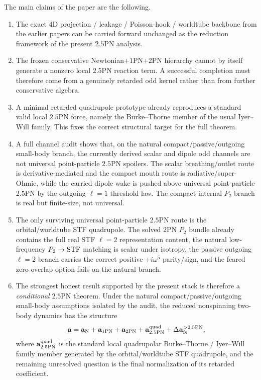 \documentclass[11pt]{article}
\begin{document}
The main claims of the paper are the following.
\begin{enumerate}
  \item The exact $4$D projection / leakage / Poisson-hook / worldtube backbone
  from the earlier papers can be carried forward unchanged as the reduction
  framework of the present $2.5$PN analysis.

  \item The frozen conservative Newtonian+$1$PN+$2$PN hierarchy cannot by itself
  generate a nonzero local $2.5$PN reaction term.  A successful completion must
  therefore come from a genuinely retarded odd kernel rather than from further
  conservative algebra.

  \item A minimal retarded quadrupole prototype already reproduces a standard
  valid local $2.5$PN force, namely the Burke--Thorne member of the usual
  Iyer--Will family.  This fixes the correct structural target for the full
  theorem.

  \item A full channel audit shows that, on the natural compact/passive/outgoing
  small-body branch, the currently derived scalar and dipole odd channels are not
  universal point-particle $2.5$PN spoilers.  The scalar breathing/outlet route
  is derivative-mediated and the compact mouth route is radiative/super-Ohmic,
  while the carried dipole wake is pushed above universal point-particle $2.5$PN
  by the outgoing $\ell=1$ threshold law.  The compact internal $P_2$ branch is
  real but finite-size, not universal.

  \item The only surviving universal point-particle $2.5$PN route is the
  orbital/worldtube STF quadrupole.  The solved $2$PN $P_2$ bundle already
  contains the full real STF $\ell=2$ representation content, the natural
  low-frequency $P_2\to{\rm STF}$ matching is scalar under isotropy, the passive
  outgoing $\ell=2$ branch carries the correct positive $+i\omega^5$ parity/sign,
  and the feared zero-overlap option fails on the natural branch.

  \item The strongest honest result supported by the present stack is therefore a
  \emph{conditional} $2.5$PN theorem.  Under the natural compact/passive/outgoing
  small-body assumptions isolated by the audit, the reduced nonspinning two-body
  dynamics has the structure
  \[
  \mathbf a
  =
  \mathbf a_{\rm N}
  + \mathbf a_{1\rm PN}
  + \mathbf a_{2\rm PN}
  + \mathbf a^{\rm quad}_{2.5\rm PN}
  + \Delta\mathbf a_{\rm fs}^{>2.5\rm PN},
  \]
  where $\mathbf a^{\rm quad}_{2.5\rm PN}$ is the standard local quadrupolar
  Burke--Thorne / Iyer--Will family member generated by the orbital/worldtube STF
  quadrupole, and the remaining unresolved question is the final normalization of
  its retarded coefficient.
\end{enumerate}
\end{document}
